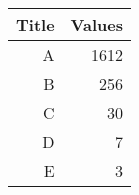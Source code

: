 \begin{tabular}{rr}
\toprule
Title & Values \\
\midrule
A     & 1612 \\
B     & 256 \\
C     & 30 \\
D     & 7 \\
E     & 3 \\
\bottomrule
\end{tabular}%
